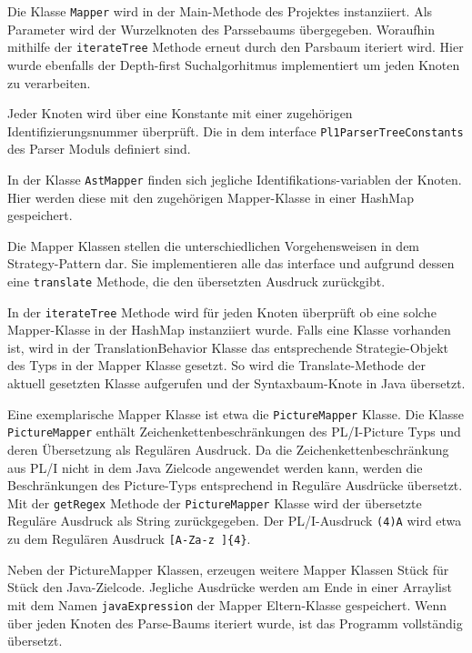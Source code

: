 Die Klasse \verb+Mapper+ wird in der Main-Methode des Projektes instanziiert. Als Parameter wird der Wurzelknoten des Parssebaums übergegeben.
Woraufhin mithilfe der \verb+iterateTree+ Methode erneut durch den Parsbaum iteriert wird. Hier wurde ebenfalls der Depth-first Suchalgorhitmus implementiert um jeden Knoten zu verarbeiten. 

Jeder Knoten wird über eine Konstante mit einer zugehörigen Identifizierungsnummer überprüft. Die in dem interface \verb+Pl1ParserTreeConstants+ des Parser Moduls definiert sind. 

In der Klasse \verb+AstMapper+ finden sich jegliche Identifikations-variablen der Knoten. Hier werden diese mit den zugehörigen Mapper-Klasse in einer HashMap gespeichert.

Die Mapper Klassen stellen die unterschiedlichen Vorgehensweisen in dem Strategy-Pattern dar. Sie implementieren alle das  interface und aufgrund dessen eine \verb+translate+ Methode, die den übersetzten Ausdruck zurückgibt. 

In der \verb+iterateTree+ Methode wird für jeden Knoten überprüft ob eine solche Mapper-Klasse in der HashMap instanziiert wurde.
Falls eine Klasse vorhanden ist, wird in der TranslationBehavior Klasse das entsprechende Strategie-Objekt
des Typs  in der
Mapper Klasse gesetzt. So wird die Translate-Methode der aktuell gesetzten Klasse aufgerufen und der Syntaxbaum-Knote in Java übersetzt.

Eine exemplarische Mapper Klasse ist etwa die \verb+PictureMapper+ Klasse.
Die Klasse \verb+PictureMapper+ enthält Zeichenkettenbeschränkungen des PL/I-Picture Typs und deren Übersetzung als Regulären Ausdruck.
Da die Zeichenkettenbeschränkung aus PL/I nicht in dem Java Zielcode angewendet werden kann, werden die Beschränkungen des Picture-Typs entsprechend in Reguläre Ausdrücke übersetzt.
Mit der \verb+getRegex+ Methode der \verb+PictureMapper+ Klasse wird der übersetzte Reguläre Ausdruck als String zurückgegeben.
Der PL/I-Ausdruck \verb+(4)A+ wird etwa zu dem Regulären Ausdruck \verb+[A-Za-z ]{4}+.   


Neben der PictureMapper Klassen, erzeugen weitere Mapper Klassen Stück für Stück den Java-Zielcode. 
Jegliche Ausdrücke werden am Ende in einer Arraylist mit dem Namen \verb+javaExpression+ der Mapper Eltern-Klasse  gespeichert.
Wenn über jeden Knoten des Parse-Baums iteriert wurde, ist das Programm vollständig übersetzt.


